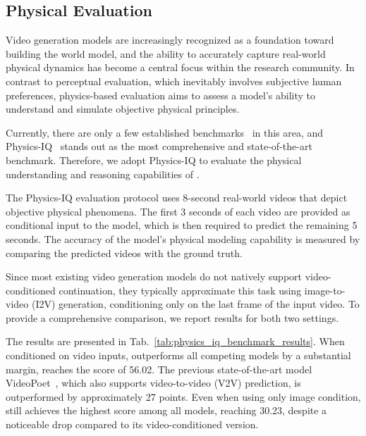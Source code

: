 \subsection{Physical Evaluation}
Video generation models are increasingly recognized as a foundation toward building the world model, and the ability to accurately capture real-world physical dynamics has become a central focus within the research community. In contrast to perceptual evaluation, which inevitably involves subjective human preferences, physics-based evaluation aims to assess a model’s ability to understand and simulate objective physical principles.


Currently, there are only a few established benchmarks~\citep{bansal2024videophy,meng2024towards,dash2011cophy,yi2019clevrer,kang2024far} in this area, and Physics-IQ~\citep{physicsiqbenchmark} stands out as the most comprehensive and state-of-the-art benchmark. Therefore, we adopt Physics-IQ to evaluate the physical understanding and reasoning capabilities of \magi.

The Physics-IQ evaluation protocol uses 8-second real-world videos that depict objective physical phenomena. The first 3 seconds of each video are provided as conditional input to the model, which is then required to predict the remaining 5 seconds. The accuracy of the model’s physical modeling capability is measured by comparing the predicted videos with the ground truth.

Since most existing video generation models do not natively support video-conditioned continuation, they typically approximate this task using image-to-video (I2V) generation, conditioning only on the last frame of the input video. To provide a comprehensive comparison, we report results for both two settings.


The results are presented in Tab.~\ref{tab:physics_iq_benchmark_results}. When conditioned on video inputs, \magi outperforms all competing models by a substantial margin, reaches the score of 56.02. The previous state-of-the-art model VideoPoet~\citep{kondratyuk2023videopoet}, which also supports video-to-video (V2V) prediction, is outperformed by approximately 27 points.
Even when using only image condition, \magi still achieves the highest score among all models, reaching 30.23, despite a noticeable drop compared to its video-conditioned version.

